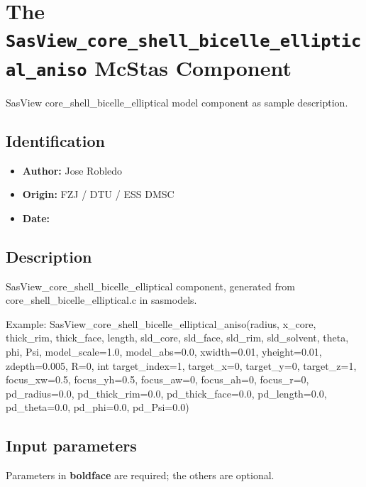 \section{The \texttt{SasView\_core\_shell\_bicelle\_elliptical\_aniso} McStas Component}
SasView core\_shell\_bicelle\_elliptical model component as sample description.

\subsection*{Identification}
\begin{itemize}
  \item \textbf{Author:} Jose Robledo
  \item \textbf{Origin:} FZJ / DTU / ESS DMSC
  \item \textbf{Date:} 
\end{itemize}

\subsection*{Description}
SasView\_core\_shell\_bicelle\_elliptical component, generated from core\_shell\_bicelle\_elliptical.c in sasmodels.

Example: SasView\_core\_shell\_bicelle\_elliptical\_aniso(radius, x\_core, thick\_rim, thick\_face, length, sld\_core, sld\_face, sld\_rim, sld\_solvent, theta, phi, Psi, model\_scale=1.0, model\_abs=0.0, xwidth=0.01, yheight=0.01, zdepth=0.005, R=0, int target\_index=1, target\_x=0, target\_y=0, target\_z=1, focus\_xw=0.5, focus\_yh=0.5, focus\_aw=0, focus\_ah=0, focus\_r=0, pd\_radius=0.0, pd\_thick\_rim=0.0, pd\_thick\_face=0.0, pd\_length=0.0, pd\_theta=0.0, pd\_phi=0.0, pd\_Psi=0.0)

\subsection*{Input parameters}
Parameters in \textbf{boldface} are required; the others are optional.

